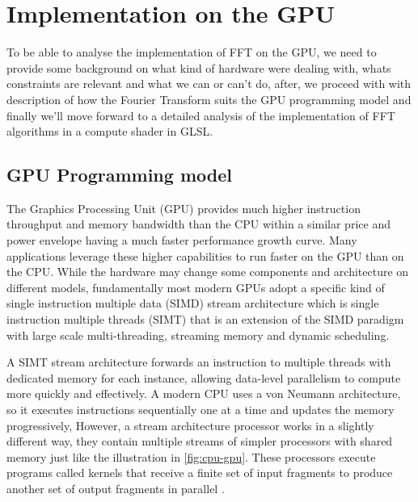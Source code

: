 \documentclass[
  oneside,
  11pt, a4paper,
  footinclude=true,
  headinclude=true,
  cleardoublepage=empty
]{scrbook}
\begin{document}
\chapter{Implementation on the GPU}

To be able to analyse the implementation of FFT on the GPU, we need to provide some background on what kind of hardware were dealing with, whats constraints are relevant and what we can or can't do, after, we proceed with with description of how the Fourier Transform suits the GPU programming model and finally we'll move forward to a detailed analysis of the implementation of FFT algorithms in a compute shader in GLSL.

\section{GPU Programming model}


The Graphics Processing Unit (GPU) provides much higher instruction throughput and memory bandwidth than the CPU within a similar price and power envelope having a much faster performance growth curve. Many applications leverage these higher capabilities to run faster on the GPU than on the CPU. While the hardware may change some components and architecture on different models, fundamentally most modern GPUs adopt a specific kind of single instruction multiple data (SIMD) stream architecture which is single instruction multiple threads (SIMT) that is an extension of the SIMD paradigm with large scale multi-threading, streaming memory and dynamic scheduling. \newline

A SIMT stream architecture forwards an instruction to multiple threads with dedicated memory for each instance, allowing data-level parallelism to compute more quickly and effectively.
A modern CPU uses a von Neumann architecture, so it executes instructions sequentially one at a time and updates the memory progressively, However, a stream architecture processor works in a slightly different way, they contain multiple streams of simpler processors with shared memory just like the illustration in \autoref{fig:cpu-gpu}. These processors execute programs called kernels that receive a finite set of input fragments to produce another set of output fragments in parallel \cite{fernando2004gpu}. \newline
\end{document}
